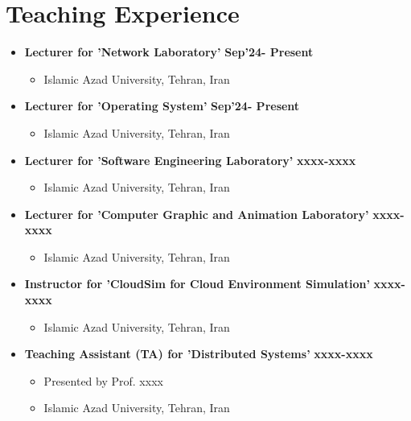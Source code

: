 \documentclass[10pt]{article} %
\begin{document}
\section{Teaching Experience}
\begin{itemize}
    \item \textbf{Lecturer for 'Network Laboratory'}
    \hfill \textbf {Sep'24- Present} 
    \begin{itemize}
        \item Islamic Azad University, Tehran, Iran
    \end{itemize}
\end{itemize}
  \hfill   \hfill 
  \begin{itemize}
    \item \textbf{Lecturer for 'Operating System'}
    \hfill \textbf {Sep'24- Present} 
    \begin{itemize}
        \item Islamic Azad University, Tehran, Iran
    \end{itemize}
\end{itemize}
  \hfill   \hfill 
  \begin{itemize}
    \item \textbf{Lecturer for 'Software Engineering Laboratory'}
    \hfill \textbf {xxxx-xxxx} 
    \begin{itemize}
        \item Islamic Azad University, Tehran, Iran
    \end{itemize}
\end{itemize}
  \hfill   \hfill 
  \begin{itemize}
    \item \textbf{Lecturer for 'Computer Graphic and Animation Laboratory'}
    \hfill \textbf {xxxx-xxxx} 
    \begin{itemize}
        \item Islamic Azad University, Tehran, Iran
    \end{itemize}
\end{itemize}
  \hfill   \hfill 
  \begin{itemize}
    \item \textbf{Instructor for 'CloudSim for Cloud Environment Simulation'}
    \hfill \textbf {xxxx-xxxx} 
    \begin{itemize}
        \item Islamic Azad University, Tehran, Iran
    \end{itemize}
\end{itemize}
  \hfill   \hfill 
  \begin{itemize}
    \item \textbf{Teaching Assistant (TA) for 'Distributed Systems'}
    \hfill \textbf {xxxx-xxxx}  
    \begin{itemize}
        \item  Presented by Prof. xxxx
        \item Islamic Azad University, Tehran, Iran
    \end{itemize}
\end{itemize}
  \hfill   \hfill 
  
\end{document}
